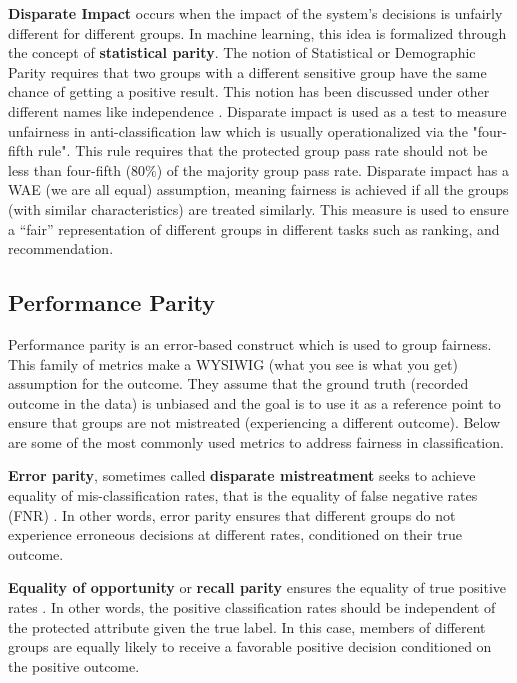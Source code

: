         \textbf{Disparate Impact} \cite{Feldman2015} occurs when the impact of the system's decisions is unfairly different for different groups. In machine learning, this idea is formalized through the concept of \textbf{statistical parity}. The notion of Statistical or Demographic Parity requires that two groups with a different sensitive group have the same chance of getting a positive result. This notion has been discussed under other different names like independence \cite{barocas2018fairness}. Disparate impact is used as a test to measure unfairness in anti-classification law\cite{corbett2018measure} which is usually operationalized via the "four-fifth rule". This rule requires that the protected group pass rate should not be less than four-fifth (80\%) of the majority group pass rate. Disparate impact has a WAE (we are all equal) assumption, meaning fairness is achieved if all the groups (with similar characteristics) are treated similarly. This measure is used to ensure a ``fair'' representation of different groups in different tasks such as ranking\cite{singh2018fairness,zehlike2017fa,yang2017measuring}, and recommendation\cite{mehtora2018towards,ekstrand2018exploring}.
    
    
    \subsection{Performance Parity}
        Performance parity is an error-based construct which is used to group fairness. This family of metrics make a WYSIWIG (what you see is what you get) assumption for the outcome. They assume that the ground truth (recorded outcome in the data) is unbiased and the goal is to use it as a reference point to ensure that groups are not mistreated (experiencing a different outcome). Below are some of the most commonly used metrics to address fairness in classification.
        
        \textbf{Error parity}, sometimes called \textbf{disparate mistreatment} seeks to achieve equality of mis-classification rates, that is the equality of false negative rates (FNR) \cite{zafar2017fairness}. In other words, error parity ensures that different groups do not experience erroneous decisions at different rates, conditioned on their true outcome.
        
        \textbf{Equality of opportunity} or \textbf{recall parity} ensures the equality of true positive rates \cite{hardt2016equality}. In other words, the positive classification rates should be independent of the protected attribute given the true label. In this case, members of different groups are equally likely to receive a favorable positive decision conditioned on the positive outcome.
        
